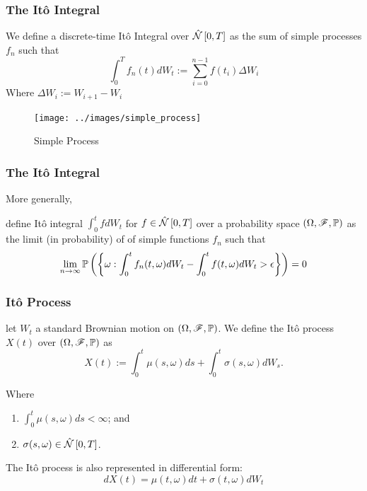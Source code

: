 \documentclass{beamer}
\begin{document}
\begin{frame}
	\frametitle{The It\^o Integral}
	We define a discrete-time It\^o Integral over $\hat{\mathcal{N}}\left[0, T\right]$ as the sum of simple processes $f_n$ such that
	\begin{equation}
		\int_0^T f_n(t) dW_t := \sum_{i=0}^{n-1}f(t_i) \Delta W_i
	\end{equation}
	Where $\Delta W_i := W_{i+1} - W_i$
\end{frame}

\begin{frame}
	\begin{figure}[hbt]
  \texttt{[image: ../images/simple\_process]}
  \caption{Simple Process}
\end{figure}
\end{frame}

\begin{frame}
	\frametitle{The It\^o Integral}
	More generally, 
	\begin{definition}
	define It\^o integral $\int_0^t fdW_t$ for $f\in \hat{\mathcal{N}}\left[0, T\right]$ over a probability space $(\Omega, \mathscr{F}, \mathbb{P})$ as the limit (in probability) of of simple functions $f_n$ such that
		\begin{equation}
		\lim_{n\to \infty} \mathbb{P}\left(\left\{\omega: \int_0^t f_n(t,\omega)dW_t - \int_0^t f(t,\omega)dW_t > \epsilon\right\} \right) = 0
	\end{equation}
	\end{definition}
\end{frame}

\begin{frame}
\frametitle{It\^o Process}
\begin{definition}
	let $W_t$ a standard Brownian motion on $(\Omega, \mathscr{F}, \mathbb{P})$. We define the It\^o process $X(t)$ over $(\Omega, \mathscr{F}, \mathbb{P})$ as
	\begin{equation}
		X(t) := \int_0^t\mu(s,\omega) ds  + \int_0^t\sigma(s,\omega) dW_s.
	\end{equation}
		
	Where
	\begin{enumerate}
		\item $\int_0^t \mu(s,\omega) ds < \infty$; and
		\item $\sigma(s,\omega) \in \hat{\mathcal{N}}\left[0, T\right]$.
	\end{enumerate}
\end{definition}

The It\^o process is also represented in differential form:
\begin{equation*}
	dX(t) = \mu(t,\omega) dt + \sigma(t,\omega) dW_t
\end{equation*}
\end{frame}
\end{document}
